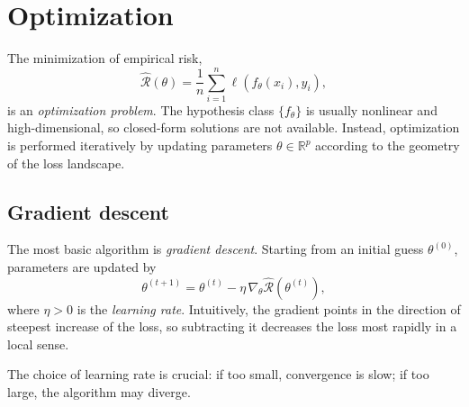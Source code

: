 
\section{Optimization}
\label{sec:ml_optimization}

The minimization of empirical risk,
\[
  \hat{\mathcal{R}}(\theta) = \frac{1}{n}\sum_{i=1}^n \ell(f_\theta(x_i),y_i),
\]
is an \emph{optimization problem}. The hypothesis class $\{f_\theta\}$ is usually 
nonlinear and high-dimensional, so closed-form solutions are not available. 
Instead, optimization is performed iteratively by updating parameters 
$\theta \in \mathbb{R}^p$ according to the geometry of the loss landscape.  

\subsection{Gradient descent}
The most basic algorithm is \emph{gradient descent}. Starting from an initial guess 
$\theta^{(0)}$, parameters are updated by
\begin{equation}
  \theta^{(t+1)} = \theta^{(t)} - \eta \,\nabla_\theta \hat{\mathcal{R}}(\theta^{(t)}),
\end{equation}
where $\eta>0$ is the \emph{learning rate}. Intuitively, the gradient points in the 
direction of steepest increase of the loss, so subtracting it decreases the loss most 
rapidly in a local sense.  

The choice of learning rate is crucial: if too small, convergence is slow; 
if too large, the algorithm may diverge.  

